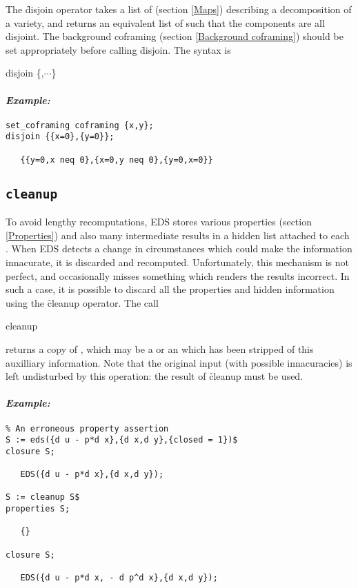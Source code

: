The \f{disjoin} operator takes a list of  (section \ref{Maps})
describing a decomposition of a variety, and returns an equivalent list of
 such that the components are all disjoint. The background
coframing (section \ref{Background coframing}) should be set appropriately
before calling \f{disjoin}. The syntax is
\begin{syntax}
	disjoin \{,$\cdots$\}
\end{syntax}

\paragraph{\it Example:}
\begin{verbatim}
set_coframing coframing {x,y};
disjoin {{x=0},{y=0}};

   {{y=0,x neq 0},{x=0,y neq 0},{y=0,x=0}}
\end{verbatim}

\subsection{\tt cleanup}
\label{cleanup}

To avoid lengthy recomputations, EDS stores various properties (section
\ref{Properties}) and also many intermediate results in a hidden list
attached to each . When EDS detects a change in circumstances
which could make the information innacurate, it is discarded and
recomputed. Unfortunately, this mechanism is not perfect, and occasionally
misses something which renders the results incorrect. In such a case, it is
possible to discard all the properties and hidden information using the
\f{cleanup} operator. The call
\begin{syntax}
	cleanup 
\end{syntax}
returns a copy of , which may be a  or an
 which has been stripped of this auxilliary information. Note
that the original input (with possible innacuracies) is left undisturbed by
this operation: the result of \f{cleanup} must be used.

\paragraph{\it Example:}
\begin{verbatim}
% An erroneous property assertion
S := eds({d u - p*d x},{d x,d y},{closed = 1})$
closure S;

   EDS({d u - p*d x},{d x,d y});

S := cleanup S$
properties S;

   {}

closure S;

   EDS({d u - p*d x, - d p^d x},{d x,d y});
\end{verbatim}

